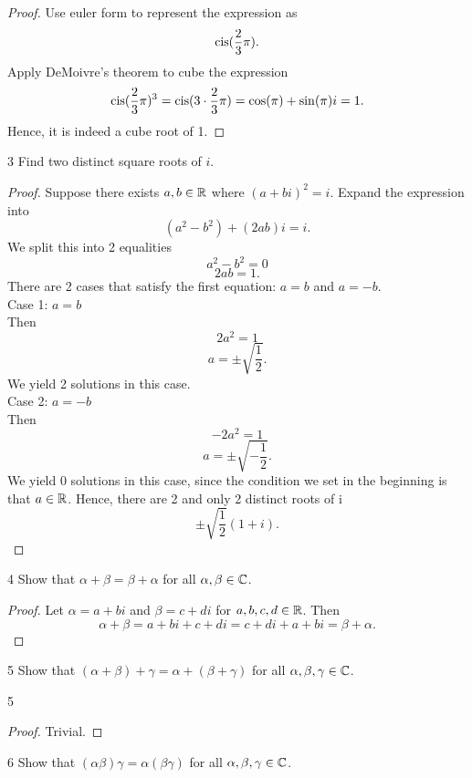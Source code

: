 \documentclass[12pt, letterpaper]{article}
\begin{document}
\begin{proof}
Use euler form to represent the expression as
$$\operatorname{cis}(\frac{2}{3}\pi).$$
Apply DeMoivre's theorem to cube the expression
$$\operatorname{cis}(\frac{2}{3}\pi)^3 = \operatorname{cis}(3\cdot\frac{2}{3}\pi) = \cos(\pi) + \sin(\pi)i = 1.$$
Hence, it is indeed a cube root of 1.
\end{proof}

\begin{problem}{3}
Find two distinct square roots of $i$.
\end{problem}

\begin{proof}
Suppose there exists $a,b\in\mathbb{R}$ where $(a+bi)^2 = i$. Expand the expression into
$$(a^2-b^2)+(2ab)i = i.$$
We split this into 2 equalities
$$a^2-b^2=0$$
$$2ab = 1.$$
There are 2 cases that satisfy the first equation: $a = b$ and $a = -b$.
\\Case 1: $a=b$
\\Then
$$2a^2 = 1$$
$$a = \pm\sqrt{\frac{1}{2}}.$$
We yield 2 solutions in this case.
\\Case 2: $a=-b$
\\Then
$$-2a^2 = 1$$
$$a = \pm\sqrt{-\frac{1}{2}}.$$
We yield 0 solutions in this case, since the condition we set in the beginning is that $a\in\mathbb{R}$.
Hence, there are 2 and only 2 distinct roots of i
$$\pm\sqrt{\frac{1}{2}}(1+i).$$
\end{proof}

\begin{problem}{4}
Show that $\alpha + \beta = \beta + \alpha$ for all $\alpha,\beta\in\mathbb{C}$.
\end{problem}

\begin{proof}
Let $\alpha = a + bi$ and $\beta = c + di$ for $a,b,c,d\in\mathbb{R}$. Then
$$\alpha + \beta = a + bi + c + di = c + di + a + bi = \beta + \alpha.$$
\end{proof}

\begin{problem}{5}
Show that $(\alpha+\beta)+\gamma=\alpha+(\beta+\gamma)$ for all $\alpha,\beta,\gamma\in\mathbb{C}$.
\end{problem}{5}

\begin{proof}
Trivial.
\end{proof}

\begin{problem}{6}
Show that $(\alpha\beta)\gamma=\alpha(\beta\gamma)$ for all $\alpha,\beta,\gamma\in\mathbb{C}$.
\end{problem}
\end{document}
